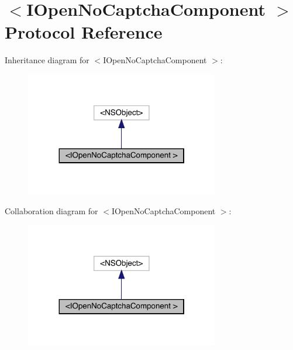 \hypertarget{protocol_i_open_no_captcha_component_01-p}{}\section{$<$I\+Open\+No\+Captcha\+Component $>$ Protocol Reference}
\label{protocol_i_open_no_captcha_component_01-p}


Inheritance diagram for $<$I\+Open\+No\+Captcha\+Component $>$\+:\nopagebreak
\begin{figure}[H]
\begin{center}
\leavevmode
\includegraphics[width=239pt]{protocol_i_open_no_captcha_component_01-p__inherit__graph}
\end{center}
\end{figure}


Collaboration diagram for $<$I\+Open\+No\+Captcha\+Component $>$\+:\nopagebreak
\begin{figure}[H]
\begin{center}
\leavevmode
\includegraphics[width=239pt]{protocol_i_open_no_captcha_component_01-p__coll__graph}
\end{center}
\end{figure}
